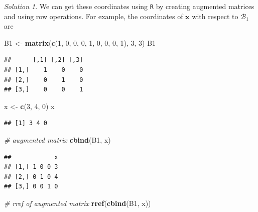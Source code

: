 \documentclass[
]{book}
\newenvironment{Shaded}{\begin{snugshade}}{\end{snugshade}}
\newcommand{\CommentTok}[1]{\textcolor[rgb]{0.56,0.35,0.01}{\textit{#1}}}
\newcommand{\DecValTok}[1]{\textcolor[rgb]{0.00,0.00,0.81}{#1}}
\newcommand{\KeywordTok}[1]{\textcolor[rgb]{0.13,0.29,0.53}{\textbf{#1}}}
\newcommand{\NormalTok}[1]{#1}
\newcommand{\StringTok}[1]{\textcolor[rgb]{0.31,0.60,0.02}{#1}}
\theoremstyle{definition}
\theoremstyle{definition}
\theoremstyle{definition}
\theoremstyle{remark}
\newtheorem*{solution}{Solution}
\begin{document}
\begin{solution}
We can get these coordinates using \texttt{R} by creating augmented matrices and using row operations. For example, the coordinates of \(\mathbf{x}\) with respect to \(\mathcal{B}_1\) are

\begin{Shaded}
\begin{Highlighting}[]
\NormalTok{B1 <-}\StringTok{ }\KeywordTok{matrix}\NormalTok{(}\KeywordTok{c}\NormalTok{(}\DecValTok{1}\NormalTok{, }\DecValTok{0}\NormalTok{, }\DecValTok{0}\NormalTok{, }\DecValTok{0}\NormalTok{, }\DecValTok{1}\NormalTok{, }\DecValTok{0}\NormalTok{, }\DecValTok{0}\NormalTok{, }\DecValTok{0}\NormalTok{, }\DecValTok{1}\NormalTok{), }\DecValTok{3}\NormalTok{, }\DecValTok{3}\NormalTok{)}
\NormalTok{B1}
\end{Highlighting}
\end{Shaded}

\begin{verbatim}
##      [,1] [,2] [,3]
## [1,]    1    0    0
## [2,]    0    1    0
## [3,]    0    0    1
\end{verbatim}

\begin{Shaded}
\begin{Highlighting}[]
\NormalTok{x <-}\StringTok{ }\KeywordTok{c}\NormalTok{(}\DecValTok{3}\NormalTok{, }\DecValTok{4}\NormalTok{, }\DecValTok{0}\NormalTok{)}
\NormalTok{x}
\end{Highlighting}
\end{Shaded}

\begin{verbatim}
## [1] 3 4 0
\end{verbatim}

\begin{Shaded}
\begin{Highlighting}[]
\CommentTok{# augmented matrix}
\KeywordTok{cbind}\NormalTok{(B1, x)}
\end{Highlighting}
\end{Shaded}

\begin{verbatim}
##            x
## [1,] 1 0 0 3
## [2,] 0 1 0 4
## [3,] 0 0 1 0
\end{verbatim}

\begin{Shaded}
\begin{Highlighting}[]
\CommentTok{# rref of augmented matrix}
\KeywordTok{rref}\NormalTok{(}\KeywordTok{cbind}\NormalTok{(B1, x))}
\end{Highlighting}
\end{Shaded}


\end{solution}
\end{document}
